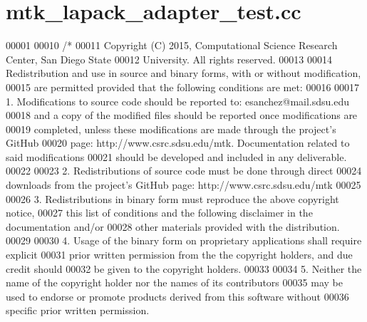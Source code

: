 \hypertarget{mtk__lapack__adapter__test_8cc_source}{\section{mtk\+\_\+lapack\+\_\+adapter\+\_\+test.\+cc}
\label{mtk__lapack__adapter__test_8cc_source}
}

\begin{DoxyCode}
00001 
00010 \textcolor{comment}{/*}
00011 \textcolor{comment}{Copyright (C) 2015, Computational Science Research Center, San Diego State}
00012 \textcolor{comment}{University. All rights reserved.}
00013 \textcolor{comment}{}
00014 \textcolor{comment}{Redistribution and use in source and binary forms, with or without modification,}
00015 \textcolor{comment}{are permitted provided that the following conditions are met:}
00016 \textcolor{comment}{}
00017 \textcolor{comment}{1. Modifications to source code should be reported to: esanchez@mail.sdsu.edu}
00018 \textcolor{comment}{and a copy of the modified files should be reported once modifications are}
00019 \textcolor{comment}{completed, unless these modifications are made through the project's GitHub}
00020 \textcolor{comment}{page: http://www.csrc.sdsu.edu/mtk. Documentation related to said modifications}
00021 \textcolor{comment}{should be developed and included in any deliverable.}
00022 \textcolor{comment}{}
00023 \textcolor{comment}{2. Redistributions of source code must be done through direct}
00024 \textcolor{comment}{downloads from the project's GitHub page: http://www.csrc.sdsu.edu/mtk}
00025 \textcolor{comment}{}
00026 \textcolor{comment}{3. Redistributions in binary form must reproduce the above copyright notice,}
00027 \textcolor{comment}{this list of conditions and the following disclaimer in the documentation and/or}
00028 \textcolor{comment}{other materials provided with the distribution.}
00029 \textcolor{comment}{}
00030 \textcolor{comment}{4. Usage of the binary form on proprietary applications shall require explicit}
00031 \textcolor{comment}{prior written permission from the the copyright holders, and due credit should}
00032 \textcolor{comment}{be given to the copyright holders.}
00033 \textcolor{comment}{}
00034 \textcolor{comment}{5. Neither the name of the copyright holder nor the names of its contributors}
00035 \textcolor{comment}{may be used to endorse or promote products derived from this software without}
00036 \textcolor{comment}{specific prior written permission.}

\end{DoxyCode}
